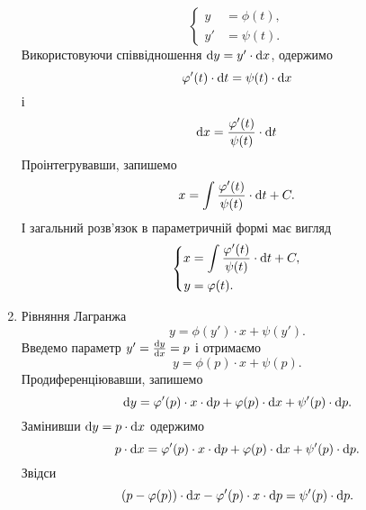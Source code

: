 \begin{enumerate}
\begin{equation*}
		\left\{\begin{aligned}
			y &= \phi(t), \\
			y' &= \psi(t).
		\end{aligned}\right.
	\end{equation*}
	Використовуючи співвідношення $\mathop{}\!\mathrm{d} y = y ' \cdot \mathop{}\!\mathrm{d} x$, одержимо 
	\begin{equation*}
		\varphi'(t) \cdot \mathop{}\!\mathrm{d} t = \psi(t) \cdot \mathop{}\!\mathrm{d} x
	\end{equation*}
	і
	\begin{equation*}
		\mathop{}\!\mathrm{d} x = \frac{\varphi'(t)}{\psi(t)} \cdot \mathop{}\!\mathrm{d} t
	\end{equation*}
	Проінтегрувавши, запишемо
	\begin{equation*}
		x = \int \frac{\varphi'(t)}{\psi(t)}\cdot \mathop{}\!\mathrm{d} t + C.
	\end{equation*}
	І загальний розв’язок в параметричній формі має вигляд
	\begin{equation*}
		\left\{\begin{aligned}
		x &= \int \frac{\varphi'(t)}{\psi(t)}\cdot \mathop{}\!\mathrm{d} t + C, \\
		y &= \varphi(t).
		\end{aligned}\right.
	\end{equation*}
	\item Рівняння Лагранжа
	\begin{equation*}
		y = \phi(y') \cdot x + \psi(y').
	\end{equation*}
	Введемо параметр $y' = \frac{\mathop{}\!\mathrm{d} y}{\mathop{}\!\mathrm{d} x} = p$ і отримаємо
	\begin{equation*}
		y = \phi(p) \cdot x + \psi(p).
	\end{equation*}
	Продиференціювавши, запишемо
	\begin{equation*}
		\mathop{}\!\mathrm{d} y = \varphi'(p) \cdot x \cdot \mathop{}\!\mathrm{d} p + \varphi(p) \cdot \mathop{}\!\mathrm{d} x + \psi'(p) \cdot \mathop{}\!\mathrm{d} p.
	\end{equation*}
	Замінивши $\mathop{}\!\mathrm{d} y = p \cdot \mathop{}\!\mathrm{d} x$ одержимо
	\begin{equation*}
		p \cdot \mathop{}\!\mathrm{d} x = \varphi'(p) \cdot x \cdot \mathop{}\!\mathrm{d} p + \varphi(p) \cdot \mathop{}\!\mathrm{d} x + \psi'(p) \cdot \mathop{}\!\mathrm{d} p.
	\end{equation*}
	Звідси
	\begin{equation*}
		(p - \varphi(p)) \cdot \mathop{}\!\mathrm{d} x - \varphi'(p) \cdot x \cdot \mathop{}\!\mathrm{d} p = \psi'(p) \cdot \mathop{}\!\mathrm{d} p.
	\end{equation*}

\end{enumerate}
